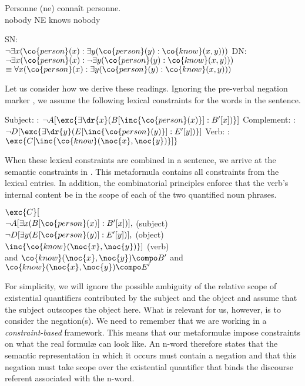 \documentclass[output=paper]{langsci/langscibook}
\begin{document}
\ea \label{personne-personne}
\gll Personne (ne) connaît personne.\\
nobody NE knows nobody\\
\begin{xlist}
\ex 
\glt SN: \\
$\lnot \exists x (\co{person}(x) : \exists y (\co{person}(y) : \co{know}(x,y)))$%
\ex 
\glt DN: \\
$\lnot \exists x (\co{person}(x) : \lnot \exists y (\co{person}(y) : \co{know}(x,y)))$\\
$\equiv \forall x (\co{person}(x) : \exists y (\co{person}(y): \co{know}(x,y)))$
\end{xlist}
\z 

Let us consider how we derive these readings.
Ignoring the pre-verbal negation marker , we assume the following lexical constraints for the words in the sentence.

\ea \label{le-personne-personne}
\begin{xlist}
\ex Subject: : $\lnot A[\exc{\exists \dr{x} (B[\inc{\co{person}(x)}]: B'[x])}]$
\ex Complement: : $\lnot D[\exc{\exists \dr{y} (E[\inc{\co{person}(y)}]: E'[y])}]$
\ex Verb: : $\exc{C[\inc{\co{know}(\noc{x},\noc{y})}]}$
\end{xlist}
\z 

When these lexical constraints are combined in a sentence, we arrive at the semantic constraints in . 
This metaformula contains all constraints from the lexical entries. In addition, the combinatorial principles enforce that the verb's internal content be in the scope of each of the two quantified noun phrases.

\ea \label{personne-personne-lf} 
$\exc{C}[$\\
$\lnot A[\exists x (B[\co{person}(x)]: B'[x])],$ \hfill (subject)\\
$\lnot D[\exists y (E[\co{person}(y)]: E'[y])],$ \hfill (object)\\
$\inc{\co{know}(\noc{x},\noc{y})}
]$ \hfill (verb)\\
and $\co{know}(\noc{x},\noc{y}) \compo B'$
and $\co{know}(\noc{x},\noc{y}) \compo E'$
\z 

For simplicity, we will ignore the possible ambiguity of the relative scope of existential quantifiers contributed by the subject and the object and assume that the subject outscopes the object here. What is relevant for us, however, is to consider the negation(s). We need to remember that we are working in a \emph{constraint-based} framework. This means that our metaformul\ae{} impose constraints on what the real formul\ae{} can look like. An n-word therefore states that the semantic representation in which it occurs must contain a negation and that this negation must take scope over the existential quantifier that binds the discourse referent associated with the n-word.
\end{document}
